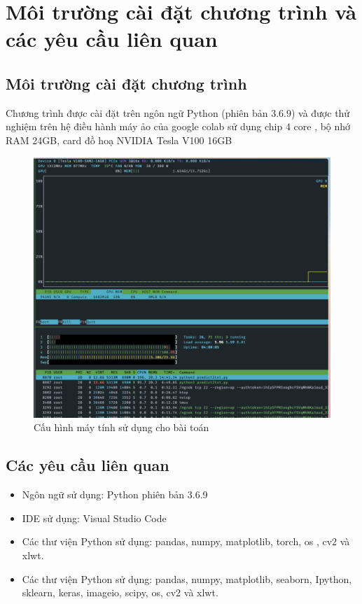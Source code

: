 \documentclass[a4paper, 12pt]{report}
\begin{document}
\section{Môi trường cài đặt chương trình và các yêu cầu liên quan}
\subsection{Môi trường cài đặt chương trình}
Chương trình được cài đặt trên ngôn ngữ Python (phiên bản 3.6.9) và được thử nghiệm trên hệ điều hành máy ảo của google colab sử dụng chip 4 core , bộ nhớ RAM 24GB,  card đồ hoạ NVIDIA Tesla V100 16GB
 \begin{figure}[!h]
	\centering
	\includegraphics[width=0.8\linewidth]{Images/nvidia-smi}
	\caption{Cấu hình máy tính sử dụng cho bài toán}
	\label{fig:nvidia-smi}
\end{figure}
\subsection{Các yêu cầu liên quan}
\begin{itemize}
	\item Ngôn ngữ sử dụng: Python phiên bản 3.6.9
	\item IDE sử dụng: Visual Studio Code
	\item Các thư viện Python sử dụng: pandas, numpy, matplotlib,  torch, os , cv2 và xlwt.
	\item Các thư viện Python sử dụng: pandas, numpy, matplotlib, seaborn, Ipython, sklearn, keras, imageio, scipy, os, cv2 và xlwt.
\end{itemize}
\end{document}
